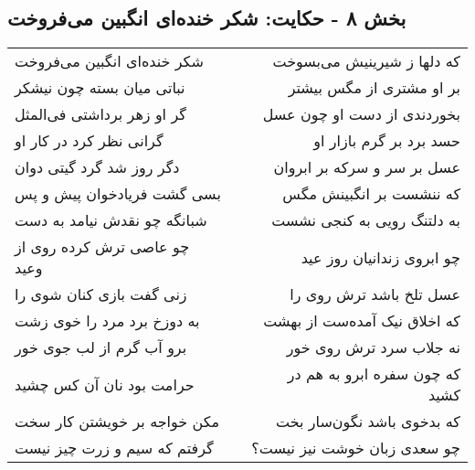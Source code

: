 \begin{center}
\section*{بخش ۸ - حکایت: شکر خنده‌ای انگبین می‌فروخت}
\label{sec:008}
\begin{longtable}{l p{0.5cm} r}
شکر خنده‌ای انگبین می‌فروخت
&&
که دلها ز شیرینیش می‌بسوخت
\\
نباتی میان بسته چون نیشکر
&&
بر او مشتری از مگس بیشتر
\\
گر او زهر برداشتی فی‌المثل
&&
بخوردندی از دست او چون عسل
\\
گرانی نظر کرد در کار او
&&
حسد برد بر گرم بازار او
\\
دگر روز شد گرد گیتی دوان
&&
عسل بر سر و سرکه بر ابروان
\\
بسی گشت فریادخوان پیش و پس
&&
که ننشست بر انگبینش مگس
\\
شبانگه چو نقدش نیامد به دست
&&
به دلتنگ رویی به کنجی نشست
\\
چو عاصی ترش کرده روی از وعید
&&
چو ابروی زندانیان روز عید
\\
زنی گفت بازی کنان شوی را
&&
عسل تلخ باشد ترش روی را
\\
به دوزخ برد مرد را خوی زشت
&&
که اخلاق نیک آمده‌ست از بهشت
\\
برو آب گرم از لب جوی خور
&&
نه جلاب سرد ترش روی خور
\\
حرامت بود نان آن کس چشید
&&
که چون سفره ابرو به هم در کشید
\\
مکن خواجه بر خویشتن کار سخت
&&
که بدخوی باشد نگون‌سار بخت
\\
گرفتم که سیم و زرت چیز نیست
&&
چو سعدی زبان خوشت نیز نیست؟
\\
\end{longtable}
\end{center}
